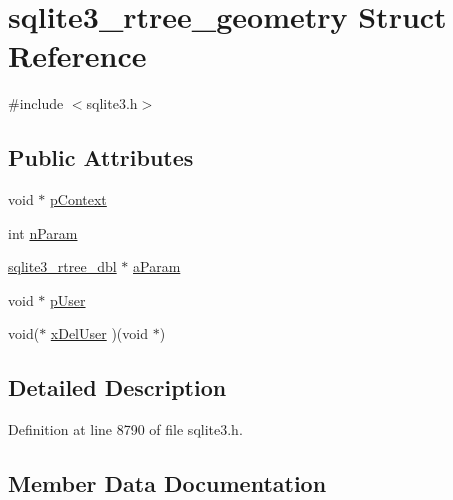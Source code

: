 \hypertarget{structsqlite3__rtree__geometry}{}\section{sqlite3\+\_\+rtree\+\_\+geometry Struct Reference}
\label{structsqlite3__rtree__geometry}


{\ttfamily \#include $<$sqlite3.\+h$>$}

\subsection*{Public Attributes}
\begin{DoxyCompactItemize}
\item 
void $\ast$ \mbox{\hyperlink{structsqlite3__rtree__geometry_a62fe439a49ed5b8628464c418f35f572}{p\+Context}}
\item 
int \mbox{\hyperlink{structsqlite3__rtree__geometry_ada7b9eba82660e3321dd4c93526697c9}{n\+Param}}
\item 
\mbox{\hyperlink{sqlite3_8h_ae9156ff58620c1ceae9391f1afabae1b}{sqlite3\+\_\+rtree\+\_\+dbl}} $\ast$ \mbox{\hyperlink{structsqlite3__rtree__geometry_a0a22e4b810cb1b8f1af792fd50493002}{a\+Param}}
\item 
void $\ast$ \mbox{\hyperlink{structsqlite3__rtree__geometry_add62e1cd5faa6000c815104af3c540d0}{p\+User}}
\item 
void($\ast$ \mbox{\hyperlink{structsqlite3__rtree__geometry_ae9835a39924a75b33cce9f6b10e1813f}{x\+Del\+User}} )(void $\ast$)
\end{DoxyCompactItemize}


\subsection{Detailed Description}


Definition at line 8790 of file sqlite3.\+h.



\subsection{Member Data Documentation}
\mbox{\label{structsqlite3__rtree__geometry_a0a22e4b810cb1b8f1af792fd50493002}} 
